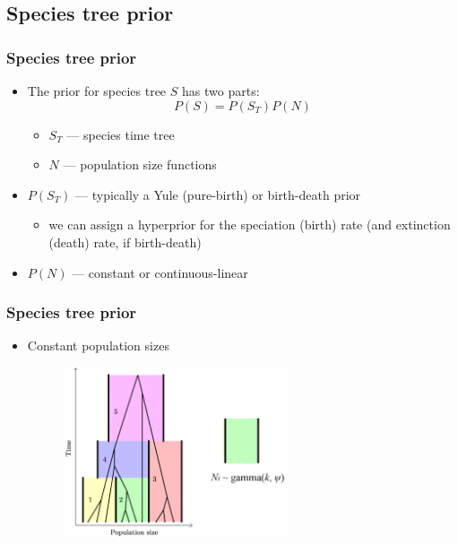 \subsection{Species tree prior}

\begin{frame}\frametitle{Species tree prior}
	\begin{itemize}
		\item The prior for species tree $S$ has two parts:
		\[ P(S) = P(S_T)P(N) \]
		\begin{itemize}
			\item $S_T$ --- species time tree 
			\item $N$ --- population size functions 
		\end{itemize}
		\item $P(S_T)$ --- typically a Yule (pure-birth) or birth-death prior
		\begin{itemize}
			\item we can assign a hyperprior for the speciation (birth) rate (and extinction (death) rate, if birth-death) 
		\end{itemize}
		\item $P(N)$ --- constant or continuous-linear
	\end{itemize}
\end{frame}

\begin{frame}\frametitle{Species tree prior}
	\begin{itemize}
		\item Constant population sizes
		\begin{figure}[h!]
 			\includegraphics[height=5cm]{figures/popFunctionConstant}
		\end{figure}
	\end{itemize}
\end{frame}


